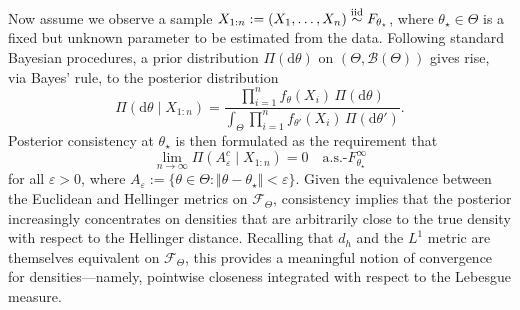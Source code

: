 \documentclass[11pt,twoside]{article}
\newcommand{\iid}{\overset{\textnormal{iid}}{\sim}}
\begin{document}
Now assume we observe a sample $X_{1:n} := (X_1, \dots, X_n) \iid F_{\theta_\star}$, where $\theta_\star \in \Theta$ is a fixed but unknown parameter to be estimated from the data. Following standard Bayesian procedures, a prior distribution $\Pi(\mathrm{d}\theta)$ on $(\Theta, \mathscr{B}(\Theta))$ gives rise, via Bayes' rule, to the posterior distribution
%
\begin{equation*}
    \Pi(\mathrm{d}\theta \mid X_{1:n}) = \frac{\prod_{i=1}^n f_\theta(X_i) \, \Pi(\mathrm{d}\theta)}{\int_\Theta \prod_{i=1}^n f_{\theta'}(X_i) \, \Pi(\mathrm{d}\theta')}.
\end{equation*}
%
Posterior consistency at $\theta_\star$ is then formulated as the requirement that
%
\begin{equation}\label{eq:posterior_consistency}
    \lim_{n \to \infty} \Pi(A_\varepsilon^c \mid X_{1:n}) = 0 \quad \text{a.s.-}F_{\theta_\star}^\infty
\end{equation}
%
for all $\varepsilon > 0$, where $A_\varepsilon := \{\theta \in \Theta : \Vert \theta - \theta_\star \Vert < \varepsilon\}$. Given the equivalence between the Euclidean and Hellinger metrics on \(\mathcal{F}_\Theta\), consistency implies that the posterior increasingly concentrates on densities that are arbitrarily close to the true density with respect to the Hellinger distance. Recalling that $d_h$ and the \(L^1\) metric are themselves equivalent on $\mathcal F_\Theta$, this provides a meaningful notion of convergence for densities—namely, pointwise closeness integrated with respect to the Lebesgue measure.
\end{document}
